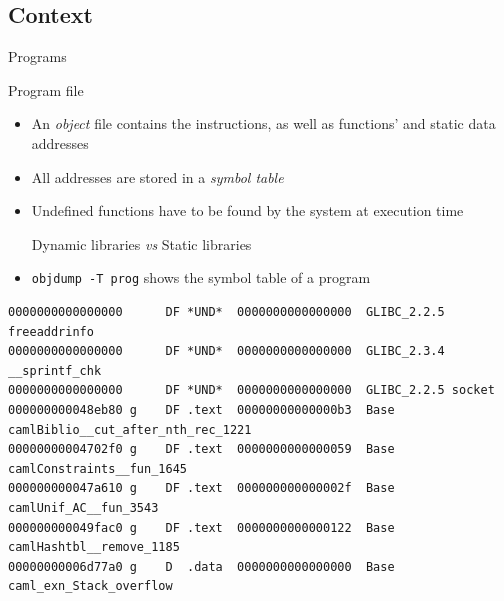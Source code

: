 \usepackage{ifthen}


\def\txthl#1{ \ifthenelse{\lengthtest{#1 pt<0.5pt}}{\top}{\bot} }



\makeatletter
\def\verbatim@font{\tiny\ttfamily}
\makeatother


\begin{reveals}
                
\maketitle

\section{Context}

\begin{frame}[c,fragile]{Programs}
  
  \begin{block}{Program file}
    \begin{itemize}
    \item An \emph{object} file contains the instructions, as well as
      functions' and static data addresses
    \item All addresses are stored in a \emph{symbol table}
    \item Undefined functions have to be found by the system at execution time
      \begin{center}
        \color{red}Dynamic libraries \textit{vs} Static libraries
      \end{center}
    \item \texttt{objdump -T prog} shows the symbol table of a program 
    \end{itemize}
  \end{block}

\begin{verbatim}
0000000000000000      DF *UND*	0000000000000000  GLIBC_2.2.5 freeaddrinfo
0000000000000000      DF *UND*	0000000000000000  GLIBC_2.3.4 __sprintf_chk
0000000000000000      DF *UND*	0000000000000000  GLIBC_2.2.5 socket
000000000048eb80 g    DF .text	00000000000000b3  Base        camlBiblio__cut_after_nth_rec_1221
00000000004702f0 g    DF .text	0000000000000059  Base        camlConstraints__fun_1645
000000000047a610 g    DF .text	000000000000002f  Base        camlUnif_AC__fun_3543
000000000049fac0 g    DF .text	0000000000000122  Base        camlHashtbl__remove_1185
00000000006d77a0 g    D  .data	0000000000000000  Base        caml_exn_Stack_overflow
\end{verbatim}


\end{frame}
\end{reveals}
